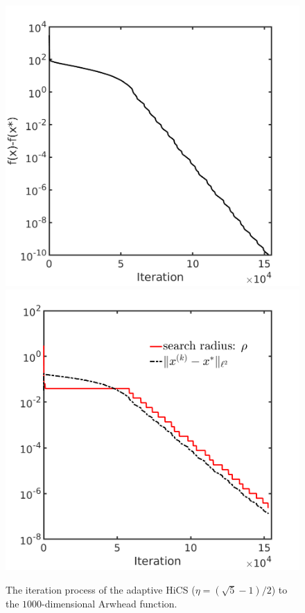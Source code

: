 \documentclass[mathpazo]{csam}
\theoremstyle{remark}
\begin{document}
\begin{figure}[!htbp]
	\centering
	  \includegraphics[scale=0.25]{../figures/arwhead1000D.png}
	  \includegraphics[scale=0.25]{../figures/arwhead1000D_dist.png}
  \caption{The iteration process of the adaptive HiCS 
  ($\eta=(\sqrt{5}-1)/2$) to the $1000$-dimensional Arwhead function.}
	\label{fig:arwhead}
\end{figure}
\end{document}
